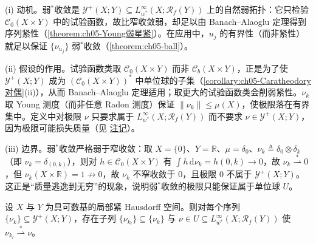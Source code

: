 \documentclass[../../main.tex]{subfiles}%
\begin{document}
\begin{remark}\label{remark:ch05-Young弱星动机}
(i) 动机。弱$^*$收敛是 $\mathcal{Y}^+(X;Y)\subseteq L^\infty_{w^*}(X;\mathscr{R}_f(Y))$ 上的自然弱拓扑：它只检验 $\mathcal{C}_0(X\times Y)$ 中的试验函数，故比窄收敛弱，却足以由 Banach--Alaoglu 定理得到序列紧性（\cref{theorem:ch05-Young弱星紧}）。在应用中，$u_j$ 的有界性（而非紧性）就足以保证 $\{\nu_{u_j}\}$ 弱$^*$收敛（\cref{theorem:ch05-ball}）。

(ii) 假设的作用。试验函数类取 $\mathcal{C}_0(X\times Y)$ 而非 $\mathcal{C}_b(X\times Y)$，正是为了使 $\mathcal{Y}^+(X;Y)$ 成为 $(\mathcal{C}_0(X\times Y))^*$ 中单位球的子集（\cref{corollary:ch05-Caratheodory对偶}(ii)），从而 Banach--Alaoglu 定理适用；取更大的试验函数类会削弱紧性。$\nu_k$ 取 Young 测度（而非任意 Radon 测度）保证 $\|\nu_k\|\leqslant\mu(X)$，使极限落在有界集中。定义中对极限 $\nu$ 只要求属于 $L^\infty_{w^*}(X;\mathscr{R}_f(Y))$ 而不要求 $\nu\in\mathcal{Y}^+(X;Y)$，因为极限可能损失质量（见 \hyperref[remark:ch05-弱星损失质量]{注记}）。

(iii) 边界。弱$^*$收敛严格弱于窄收敛：取 $X=\{0\}$、$Y=\mathbb{R}$、$\mu=\delta_0$、$\nu_k\triangleq\delta_0\otimes\delta_k$（即 $\nu_k=\delta_{(0,k)}$），则对 $h\in\mathcal{C}_0(X\times Y)$ 有 $\int h\,\mathrm{d}\nu_k=h(0,k)\to0$，故 $\nu_k\stackrel{*}{\rightharpoonup}0$，但 $\nu_k(X\times\mathbb{R})=1\not\to0$，故 $\nu_k$ 不窄收敛于 $0$，且极限 $0$ 不属于 $\mathcal{Y}^+(X;Y)$。这正是“质量逃逸到无穷”的现象，说明弱$^*$收敛的极限只能保证属于单位球 $U$。
\end{remark}

\begin{theorem}[弱$^*$序列紧性]\label{theorem:ch05-Young弱星紧}
设 $X$ 与 $Y$ 为具可数基的局部紧 Hausdorff 空间。则对每个序列 $\{\nu_k\}\subseteq\mathcal{Y}^+(X;Y)$，存在子列 $\{\nu_{k_l}\}\subseteq\{\nu_k\}$ 与 $\nu\in U\subseteq L^\infty_{w^*}(X;\mathscr{R}_f(Y))$ 使 $\nu_{k_l}\stackrel{*}{\rightharpoonup}\nu$。
\end{theorem}
\end{document}
